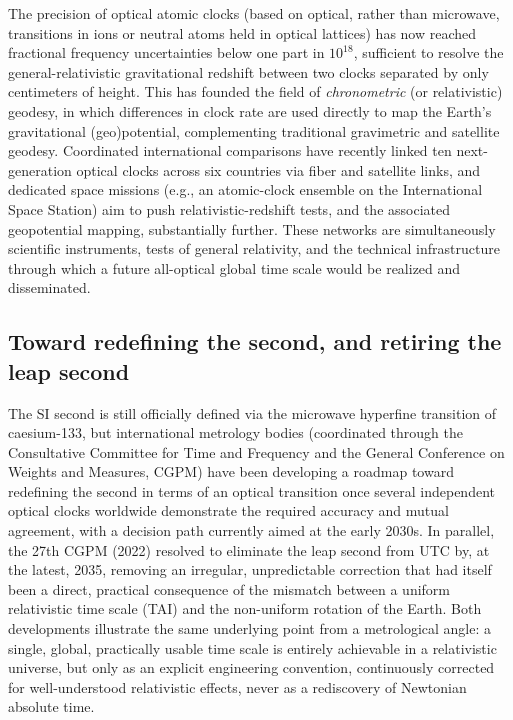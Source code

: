 \documentclass[11pt]{article}
\begin{document}
The precision of optical atomic clocks (based on optical, rather than microwave, transitions in ions or neutral atoms held in optical lattices) has now reached fractional frequency uncertainties below one part in $10^{18}$, sufficient to resolve the general-relativistic gravitational redshift between two clocks separated by only centimeters of height. This has founded the field of \emph{chronometric} (or relativistic) geodesy, in which differences in clock rate are used directly to map the Earth's gravitational (geo)potential, complementing traditional gravimetric and satellite geodesy. Coordinated international comparisons have recently linked ten next-generation optical clocks across six countries via fiber and satellite links, and dedicated space missions (e.g., an atomic-clock ensemble on the International Space Station) aim to push relativistic-redshift tests, and the associated geopotential mapping, substantially further. These networks are simultaneously scientific instruments, tests of general relativity, and the technical infrastructure through which a future all-optical global time scale would be realized and disseminated.

\subsection{Toward redefining the second, and retiring the leap second}

The SI second is still officially defined via the microwave hyperfine transition of caesium-133, but international metrology bodies (coordinated through the Consultative Committee for Time and Frequency and the General Conference on Weights and Measures, CGPM) have been developing a roadmap toward redefining the second in terms of an optical transition once several independent optical clocks worldwide demonstrate the required accuracy and mutual agreement, with a decision path currently aimed at the early 2030s. In parallel, the 27th CGPM (2022) resolved to eliminate the leap second from UTC by, at the latest, 2035, removing an irregular, unpredictable correction that had itself been a direct, practical consequence of the mismatch between a uniform relativistic time scale (TAI) and the non-uniform rotation of the Earth. Both developments illustrate the same underlying point from a metrological angle: a single, global, practically usable time scale is entirely achievable in a relativistic universe, but only as an explicit engineering convention, continuously corrected for well-understood relativistic effects, never as a rediscovery of Newtonian absolute time.
\end{document}
